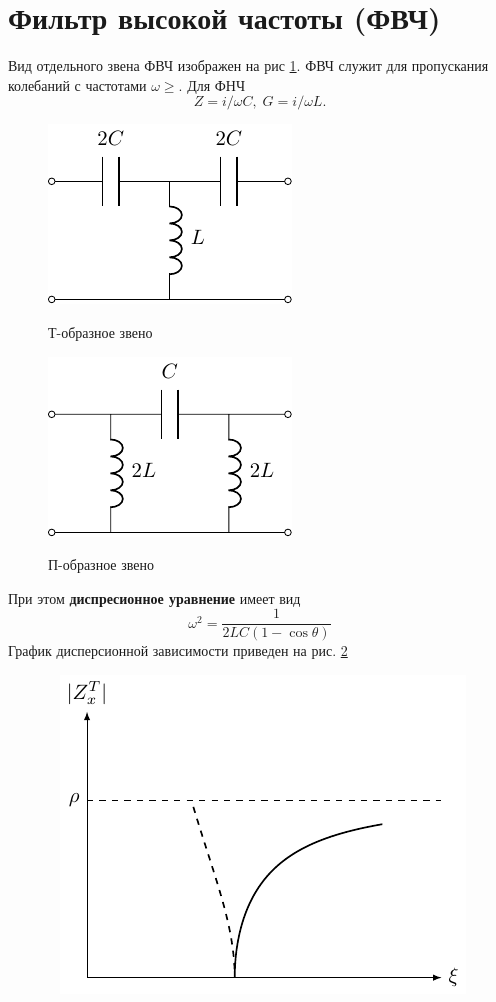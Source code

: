 \section{Фильтр высокой частоты (ФВЧ)} 
Вид отдельного звена ФВЧ изображен на рис \ref{fig:6.1}. ФВЧ служит для пропускания колебаний с частотами $\omega\geq$. Для ФНЧ
\begin{equation}
\label{eq:6.1.1}
Z=i/\omega C,\;G=i/\omega L.
\end{equation}
\begin{figure}[h!]
	\begin{minipage}{0.49\linewidth}
		\centering
		\includegraphics[]{chem/FHF/FHFT.pdf}
		\caption*{Т-образное звено}
	\end{minipage}
	\begin{minipage}{0.49\linewidth}
		\centering
		\includegraphics[]{chem/FHF/FHFP.pdf}
		\caption*{П-образное звено}
	\end{minipage}
	\caption{}
	\label{fig:6.1}
\end{figure}
При этом \textbf{диспресионное уравнение} имеет вид 
\begin{equation}
\label{eq:6.1.2}
\omega^2=\frac{1}{2LC(1-\cos\theta)}
\end{equation}
График дисперсионной зависимости приведен на рис. \ref{fig:6.2}
\begin{figure}[h!]
	\centering 
	\includegraphics[]{chem/FHF/ZxP2.pdf}
	\caption{}
	\label{fig:6.2}
\end{figure}


